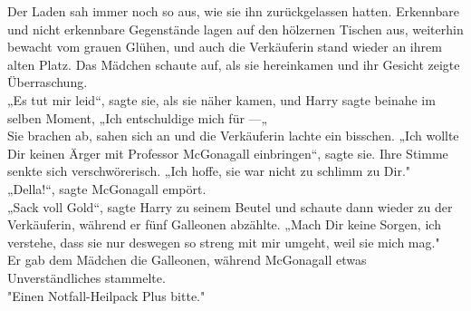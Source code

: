 {Der Laden sah immer noch so aus, wie sie ihn zurückgelassen hatten. Erkennbare und nicht erkennbare Gegenstände lagen auf den hölzernen Tischen aus, weiterhin bewacht vom grauen Glühen, und auch die Verkäuferin stand wieder an ihrem alten Platz. Das Mädchen schaute auf, als sie hereinkamen und ihr Gesicht zeigte Überraschung.\\ „Es tut mir leid“, sagte sie, als sie näher kamen, und Harry sagte beinahe im selben Moment, „Ich entschuldige mich für ---„\\ Sie brachen ab, sahen sich an und die Verkäuferin lachte ein bisschen. „Ich wollte Dir keinen Ärger mit Professor McGonagall einbringen“, sagte sie. Ihre Stimme senkte sich verschwörerisch. „Ich hoffe, sie war nicht zu schlimm zu Dir."\\ „Della!“, sagte McGonagall empört.\\ „Sack voll Gold“, sagte Harry zu seinem Beutel und schaute dann wieder zu der Verkäuferin, während er fünf Galleonen abzählte. „Mach Dir keine Sorgen, ich verstehe, dass sie nur deswegen so streng mit mir umgeht, weil sie mich mag."\\ Er gab dem Mädchen die Galleonen, während McGonagall etwas Unverständliches stammelte.\\ "Einen Notfall-Heilpack Plus bitte."

}
